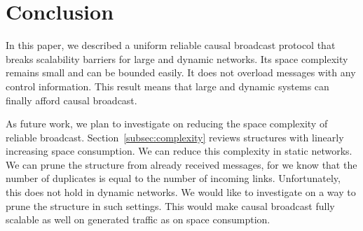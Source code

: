 
\section{Conclusion}
\label{sec:conclusion}



In this paper, we described a uniform reliable causal broadcast protocol that
breaks scalability barriers for large and dynamic networks. Its space complexity
remains small and can be bounded easily. It does not overload messages with any
control information. This result means that large and dynamic systems can
finally afford causal broadcast.




As future work, we plan to investigate on reducing the space complexity of
reliable broadcast. Section~\ref{subsec:complexity} reviews structures with
linearly increasing space consumption. We can reduce this complexity in static
networks. We can prune the structure from already received messages, for we know
that the number of duplicates is equal to the number of incoming
links. Unfortunately, this does not hold in dynamic networks. We would like to
investigate on a way to prune the structure in such settings. This would make
causal broadcast fully scalable as well on generated traffic as on space
consumption.







